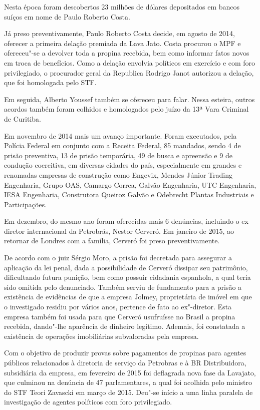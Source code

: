 {Nesta época foram descobertos 23 milhões de dólares depositados em
bancos suíços em nome de Paulo Roberto Costa.

Já preso preventivamente, Paulo Roberto Costa decide, em agosto de 2014,
oferecer a primeira delação premiada da Lava Jato. Costa procurou o MPF
e ofereceu"-se a devolver toda a propina recebida, bem como informar
fatos novos em troca de benefícios. Como a delação envolvia políticos em
exercício e com foro privilegiado, o procurador geral da Republica
Rodrigo Janot autorizou a delação, que foi homologada pelo STF.

Em seguida, Alberto Youssef também se ofereceu para falar. Nessa
esteira, outros acordos também foram colhidos e homologados pelo juízo
da 13ª Vara Criminal de Curitiba.

Em novembro de 2014 mais um avanço importante. Foram executados, pela
Polícia Federal em conjunto com a Receita Federal, 85 mandados, sendo 4
de prisão preventiva, 13 de prisão temporária, 49 de busca e apreensão e
9 de condução coercitiva, em diversas cidades do país, especialmente em
grandes e renomadas empresas de construção como Engevix, Mendes Júnior
Trading Engenharia, Grupo OAS, Camargo Correa, Galvão Engenharia, UTC
Engenharia, IESA Engenharia, Construtora Queiroz Galvão e Odebrecht
Plantas Industriais e Participações.

Em dezembro, do mesmo ano foram oferecidas mais 6 denúncias, incluindo o
ex diretor internacional da Petrobrás, Nestor Cerveró. Em janeiro de
2015, ao retornar de Londres com a família, Cerveró foi preso
preventivamente.

De acordo com o juiz Sérgio Moro, a prisão foi decretada para assegurar
a aplicação da lei penal, dada a possibilidade de Cerveró dissipar seu
patrimônio, dificultando futura punição, bem como possuir cidadania
espanhola, a qual teria sido omitida pelo denunciado. Também serviu de
fundamento para a prisão a existência de evidências de que a empresa
Jolmey, proprietária de imóvel em que o investigado residiu por vários
anos, pertence de fato ao ex"-diretor. Esta empresa também foi usada para
que Cerveró usufruísse no Brasil a propina recebida, dando"-lhe aparência
de dinheiro legítimo. Ademais, foi constatada a existência de operações
imobiliárias subvaloradas pela empresa.

Com o objetivo de produzir provas sobre pagamentos de propinas para
agentes públicos relacionados à diretoria de serviço da Petrobras e à BR
Distribuidora, subsidiária da empresa, em fevereiro de 2015 foi
deflagrada nova fase da Lavajato, que culminou na denúncia de 47
parlamentares, a qual foi acolhida pelo ministro do STF Teori Zavascki
em março de 2015. Deu"-se início a uma linha paralela de investigação de
agentes políticos com foro privilegiado.

}
